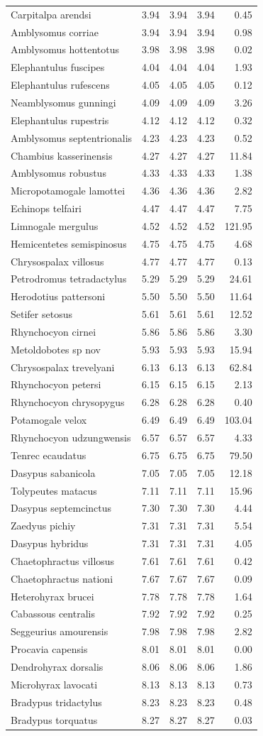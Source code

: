 \documentclass[10pt,letterpaper]{article}
\begin{document}
\begin{longtable}[]{@{}lrrrr@{}}
Carpitalpa arendsi & 3.94 & 3.94 & 3.94 & 0.45\tabularnewline
Amblysomus corriae & 3.94 & 3.94 & 3.94 & 0.98\tabularnewline
Amblysomus hottentotus & 3.98 & 3.98 & 3.98 & 0.02\tabularnewline
Elephantulus fuscipes & 4.04 & 4.04 & 4.04 & 1.93\tabularnewline
Elephantulus rufescens & 4.05 & 4.05 & 4.05 & 0.12\tabularnewline
Neamblysomus gunningi & 4.09 & 4.09 & 4.09 & 3.26\tabularnewline
Elephantulus rupestris & 4.12 & 4.12 & 4.12 & 0.32\tabularnewline
Amblysomus septentrionalis & 4.23 & 4.23 & 4.23 & 0.52\tabularnewline
Chambius kasserinensis & 4.27 & 4.27 & 4.27 & 11.84\tabularnewline
Amblysomus robustus & 4.33 & 4.33 & 4.33 & 1.38\tabularnewline
Micropotamogale lamottei & 4.36 & 4.36 & 4.36 & 2.82\tabularnewline
Echinops telfairi & 4.47 & 4.47 & 4.47 & 7.75\tabularnewline
Limnogale mergulus & 4.52 & 4.52 & 4.52 & 121.95\tabularnewline
Hemicentetes semispinosus & 4.75 & 4.75 & 4.75 & 4.68\tabularnewline
Chrysospalax villosus & 4.77 & 4.77 & 4.77 & 0.13\tabularnewline
Petrodromus tetradactylus & 5.29 & 5.29 & 5.29 & 24.61\tabularnewline
Herodotius pattersoni & 5.50 & 5.50 & 5.50 & 11.64\tabularnewline
Setifer setosus & 5.61 & 5.61 & 5.61 & 12.52\tabularnewline
Rhynchocyon cirnei & 5.86 & 5.86 & 5.86 & 3.30\tabularnewline
Metoldobotes sp nov & 5.93 & 5.93 & 5.93 & 15.94\tabularnewline
Chrysospalax trevelyani & 6.13 & 6.13 & 6.13 & 62.84\tabularnewline
Rhynchocyon petersi & 6.15 & 6.15 & 6.15 & 2.13\tabularnewline
Rhynchocyon chrysopygus & 6.28 & 6.28 & 6.28 & 0.40\tabularnewline
Potamogale velox & 6.49 & 6.49 & 6.49 & 103.04\tabularnewline
Rhynchocyon udzungwensis & 6.57 & 6.57 & 6.57 & 4.33\tabularnewline
Tenrec ecaudatus & 6.75 & 6.75 & 6.75 & 79.50\tabularnewline
Dasypus sabanicola & 7.05 & 7.05 & 7.05 & 12.18\tabularnewline
Tolypeutes matacus & 7.11 & 7.11 & 7.11 & 15.96\tabularnewline
Dasypus septemcinctus & 7.30 & 7.30 & 7.30 & 4.44\tabularnewline
Zaedyus pichiy & 7.31 & 7.31 & 7.31 & 5.54\tabularnewline
Dasypus hybridus & 7.31 & 7.31 & 7.31 & 4.05\tabularnewline
Chaetophractus villosus & 7.61 & 7.61 & 7.61 & 0.42\tabularnewline
Chaetophractus nationi & 7.67 & 7.67 & 7.67 & 0.09\tabularnewline
Heterohyrax brucei & 7.78 & 7.78 & 7.78 & 1.64\tabularnewline
Cabassous centralis & 7.92 & 7.92 & 7.92 & 0.25\tabularnewline
Seggeurius amourensis & 7.98 & 7.98 & 7.98 & 2.82\tabularnewline
Procavia capensis & 8.01 & 8.01 & 8.01 & 0.00\tabularnewline
Dendrohyrax dorsalis & 8.06 & 8.06 & 8.06 & 1.86\tabularnewline
Microhyrax lavocati & 8.13 & 8.13 & 8.13 & 0.73\tabularnewline
Bradypus tridactylus & 8.23 & 8.23 & 8.23 & 0.48\tabularnewline
Bradypus torquatus & 8.27 & 8.27 & 8.27 & 0.03\tabularnewline

\end{longtable}
\end{document}
